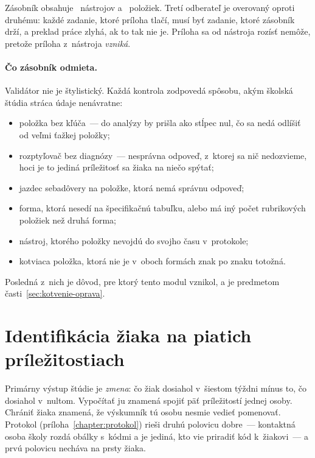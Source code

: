 Zásobník obsahuje \asmBanks{}~nástrojov a \asmItems{}~položiek. Tretí odberateľ je
overovaný oproti druhému: každé zadanie, ktoré príloha tlačí, musí byť zadanie,
ktoré zásobník drží, a preklad práce zlyhá, ak to tak nie je. Príloha sa od
nástroja rozísť nemôže, pretože príloha z~nástroja \emph{vzniká}.

\paragraph{Čo zásobník odmieta.} Validátor nie je štylistický. Každá kontrola
zodpovedá spôsobu, akým školská štúdia stráca údaje nenávratne:

\begin{itemize}[nosep]
    \item položka bez kľúča~--- do analýzy by prišla ako stĺpec nul, čo sa nedá
          odlíšiť od veľmi ťažkej položky;
    \item rozptyľovač bez diagnózy~--- nesprávna odpoveď, z~ktorej sa nič
          nedozvieme, hoci je to jediná príležitosť sa žiaka na niečo spýtať;
    \item jazdec sebadôvery na položke, ktorá nemá správnu odpoveď;
    \item forma, ktorá nesedí na špecifikačnú tabuľku, alebo má iný počet
          rubrikových položiek než druhá forma;
    \item nástroj, ktorého položky nevojdú do svojho času v~protokole;
    \item kotviaca položka, ktorá nie je v~oboch formách znak po znaku totožná.
\end{itemize}

Posledná z~nich je dôvod, pre ktorý tento modul vznikol, a je predmetom
časti~\ref{sec:kotvenie-oprava}.

\section{Identifikácia žiaka na piatich príležitostiach}
\label{sec:kod-ziaka}

Primárny výstup štúdie je \emph{zmena}: čo žiak dosiahol v~šiestom týždni mínus
to, čo dosiahol v~nultom. Vypočítať ju znamená spojiť päť príležitostí jednej
osoby. Chrániť žiaka znamená, že výskumník tú osobu nesmie vedieť pomenovať.
Protokol (príloha~\ref{chapter:protokol}) rieši druhú polovicu dobre~--- kontaktná
osoba školy rozdá obálky s~kódmi a je jediná, kto vie priradiť kód k~žiakovi~---
a prvú polovicu necháva na prsty žiaka.

